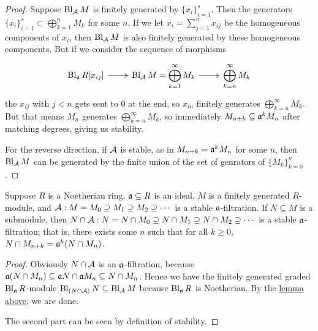 \begin{proof}
    Suppose \(\operatorname{Bl}_{\mathcal{A}} M\) is finitely generated by \({\{x_i\}}_{i=1}^s\).
    Then the generators \({\{x_i\}}_{i=1}^s \subset \bigoplus_{k=1}^n M_k\) for some \(n\).
    If we let \(x_i = \sum_{j=1}^n x_{ij}\) be the homogeneous components of \(x_i\),
    then \(\operatorname{Bl}_{\mathcal{A}} M\) is also finitely generated by these homogeneous components.
    But if we consider the sequence of morphisms
    \begin{equation*}
        \begin{tikzcd}
            \Bl_\mfk{a} R[x_{ij}] \arrow[twoheadrightarrow]{r} &
            \Bl_\mca{A} M = \displaystyle\bigoplus_{k=1}^\infty M_k \arrow[twoheadrightarrow]{r} &
            \displaystyle\bigoplus_{k=n}^\infty M_k
        \end{tikzcd}
    \end{equation*}
    the \(x_{ij}\) with \(j < n\) gets sent to 0 at the end,
    so \(x_{in}\) finitely generates \(\bigoplus_{k=n}^\infty M_k\).
    But that means \(M_n\) generates \(\bigoplus_{k=n}^\infty M_k\),
    so immediately \(M_{n+k} \subseteq \mathfrak{a}^k M_n\) after matching degrees,
    giving us stability.

    For the reverse direction, if \(\mathcal{A}\) is stable, as in \(M_{n+k} = \mathfrak{a}^k M_n\) for some \(n\),
    then \(\operatorname{Bl}_{\mathcal{A}} M\) can be generated by the finite union of the set of genrators of \({\{M_k\}}_{k=0}^n\).
\end{proof}
\begin{proposition}\label{prop:artin-rees}
    Suppose \(R\) is a Noetherian ring, \(\mathfrak{a} \subseteq R\) is an ideal,
    \(M\) is a finitely generated \(R\)-module,
    and \(\mathcal{A}: M = M_0 \supseteq M_1 \supseteq M_2 \supseteq \cdots\) is a stable \(\mathfrak{a}\)-filtration.
    If \(N \subseteq M\) is a submodule,
    then \(N\cap\mathcal{A}: N = N \cap M_0 \supseteq N \cap M_1 \supseteq N \cap M_2 \supseteq \cdots\)
    is a stable \(\mathfrak{a}\)-filtration;
    that is, there exists some \(n\) such that for all \(k \geq 0\),
    \(N \cap M_{n+k} = \mathfrak{a}^k(N \cap M_n)\).
\end{proposition}
\begin{proof}
    Obviously \(N\cap\mathcal{A}\) is an \(\mathfrak{a}\)-filtration,
    because \(\mathfrak{a}(N \cap M_n) \subseteq \mathfrak{a}N \cap \mathfrak{a}M_n \subseteq N \cap M_n\).
    Hence we have the finitely generated graded \(\operatorname{Bl}_{\mathfrak{a}} R\)-module
    \(\operatorname{Bl}_{(N\cap\mathcal{A})} N \subseteq \operatorname{Bl}_{\mathcal{A}} M\) because \(\operatorname{Bl}_{\mathfrak{a}} R\) is Noetherian.
    By the \hyperref[lem:stable-blowup]{lemma above},
    we are done.

    The second part can be seen by definition of stability.
\end{proof}

